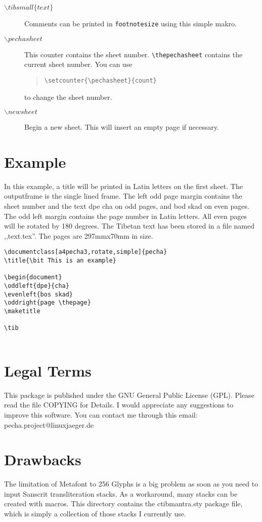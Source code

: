 \documentclass[a4paper,11pt]{article}
\begin{document}
\begin{description}
\item[$\backslash tibsmall\{text\}$] Comments can be printed in \verb-footnotesize- using this simple makro.

\item[$\backslash pechasheet$] This counter contains the sheet number. \verb-\thepechasheet- contains the current sheet number. You can use 
\begin{quote}
	\verb-\setcounter{\pechasheet}{count}- 
\end{quote}
to change the sheet number.
\item[$\backslash newsheet$] Begin a new sheet. This will insert an empty page if necessary.
\end{description} 

\section{Example}
In this example, a title will be printed in Latin letters on the first sheet. The outputframe is the single lined frame. The left odd page margin contains the sheet number and the text {\tiny\tib dpe cha} on odd pages, and {\tiny\tib bod skad} on even pages. The odd left margin contains the page number in Latin letters. All even pages will be rotated by 180 degrees. The Tibetan text has been stored in a file named ,,text.tex''. The pages are 297mmx70mm in size.

\begin{verbatim}
\documentclass[a4pecha3,rotate,simple]{pecha}
\title{\bit This is an example}

\begin{document}
\oddleft{dpe}{cha}
\evenleft{bos skad}
\oddright{page \thepage}
\maketitle

\tib


\end{verbatim} 

\section{Legal Terms}
This package is published under the GNU General Public License (GPL). Please read the file COPYING for Details. I would appreciate any suggestions to improve this software. You can contact me through this email: pecha.project@linuxjaeger.de

\section{Drawbacks}
The limitation of Metafont to 256 Glyphs is a big problem as soon as you need to input Sanscrit transliteration stacks. As a workaround, many stacks can be created with macros. This directory contains the ctibmantra.sty package file, which is simply a collection of those stacks I currently use.
\end{document}
